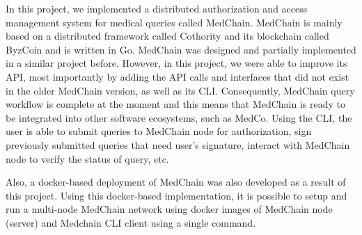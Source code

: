 
In this project, we implemented a distributed authorization and access management system for medical queries called MedChain. MedChain is mainly based on a distributed framework called Cothority and its blockchain called ByzCoin and is written in Go. MedChain was designed and partially implemented in a similar project before. However, in this project, we were able to improve its API, most importantly by adding the API calls and interfaces that did not exist in the older MedChain version, as well as its CLI. Consequently, MedChain query workflow is complete at the moment and this means that MedChain is ready to be integrated into other software ecosystems, such as MedCo. Using the CLI, the user is able to submit queries to MedChain node for authorization, sign previously submitted queries that need user's signature, interact with MedChain node to verify the status of query, etc. 

Also, a docker-based deployment of MedChain was also developed as a result of this project. Using this docker-based implementation, it is possible to setup and run a multi-node MedChain network using docker images of MedChain node (server) and Medchain CLI client using a single command. 